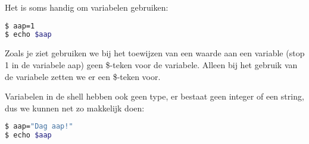 Het is soms handig om variabelen gebruiken:

\begin{lstlisting}[language=bash]
$ aap=1
$ echo $aap
\end{lstlisting}

Zoals je ziet gebruiken we bij het toewijzen van een waarde aan een variable (stop 1 in de variabele aap) geen \$-teken voor de variabele. Alleen bij het gebruik van de variabele zetten we er een \$-teken voor.

Variabelen in de shell hebben ook geen type, er bestaat geen integer of een string, dus we kunnen net zo makkelijk
doen:

\begin{lstlisting}[language=bash]
$ aap="Dag aap!"
$ echo $aap
\end{lstlisting}
